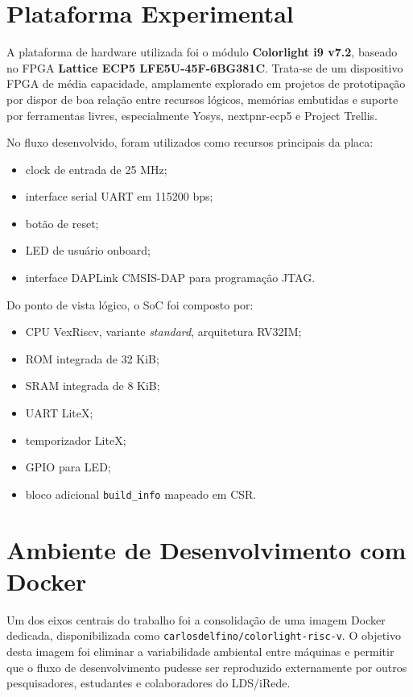 \documentclass[10pt,twocolumn,a4paper]{article}
\begin{document}
\section{Plataforma Experimental}
A plataforma de hardware utilizada foi o m\'odulo \textbf{Colorlight i9 v7.2}, baseado no FPGA \textbf{Lattice ECP5 LFE5U-45F-6BG381C}. Trata-se de um dispositivo FPGA de m\'edia capacidade, amplamente explorado em projetos de prototipa\c{c}\~ao por dispor de boa rela\c{c}\~ao entre recursos l\'ogicos, mem\'orias embutidas e suporte por ferramentas livres, especialmente Yosys, nextpnr-ecp5 e Project Trellis.

No fluxo desenvolvido, foram utilizados como recursos principais da placa:
\begin{itemize}[leftmargin=*]
    \item clock de entrada de 25 MHz;
    \item interface serial UART em 115200 bps;
    \item bot\~ao de reset;
    \item LED de usu\'ario onboard;
    \item interface DAPLink CMSIS-DAP para programa\c{c}\~ao JTAG.
\end{itemize}

Do ponto de vista l\'ogico, o SoC foi composto por:
\begin{itemize}[leftmargin=*]
    \item CPU VexRiscv, variante \textit{standard}, arquitetura RV32IM;
    \item ROM integrada de 32 KiB;
    \item SRAM integrada de 8 KiB;
    \item UART LiteX;
    \item temporizador LiteX;
    \item GPIO para LED;
    \item bloco adicional \texttt{build\_info} mapeado em CSR.
\end{itemize}

\section{Ambiente de Desenvolvimento com Docker}
Um dos eixos centrais do trabalho foi a consolida\c{c}\~ao de uma imagem Docker dedicada, disponibilizada como \texttt{carlosdelfino/colorlight-risc-v}. O objetivo desta imagem foi eliminar a variabilidade ambiental entre m\'aquinas e permitir que o fluxo de desenvolvimento pudesse ser reproduzido externamente por outros pesquisadores, estudantes e colaboradores do LDS/iRede.
\end{document}
